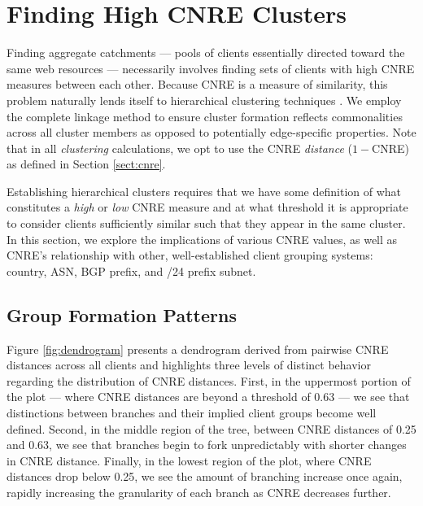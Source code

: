 \section{Finding High CNRE Clusters} \label{sect:finding}

\begin{figure*}
    \caption{Dendrogram of CNRE distance across all client pairs}
    \label{fig:dendrogram}
\end{figure*}

Finding aggregate catchments --- pools of clients essentially directed toward
the same web resources --- necessarily involves finding sets of clients with high
CNRE measures between each other. Because CNRE is a measure of similarity, this
problem naturally lends itself to hierarchical clustering techniques \cite{murtagh1983survey}. 
We employ the complete linkage method to ensure cluster formation reflects commonalities
across all cluster members as opposed to potentially edge-specific properties.
Note that in all \emph{clustering} calculations, we opt to use the CNRE \emph{distance}
(\(1-\)CNRE) as defined in Section \ref{sect:cnre}.

Establishing hierarchical clusters requires that we have some definition of what
constitutes a \emph{high} or \emph{low} CNRE measure and at what threshold it is
appropriate to consider clients sufficiently similar such that they appear in
the same cluster. In this section, we explore the implications of various CNRE
values, as well as CNRE's relationship with other, well-established client grouping
systems: country, ASN, BGP prefix, and /24 prefix subnet.

\begin{figure*}
    \caption{Dendrogram of CNRE distance across all client pairs}
    \label{fig:dendrogram}
\end{figure*}

\subsection{Group Formation Patterns}
\label{s:formation}

Figure \ref{fig:dendrogram} presents a dendrogram derived from pairwise CNRE
distances across all clients and highlights three levels of distinct behavior
regarding the distribution of CNRE distances. First, in the uppermost portion of
the plot --- where CNRE distances are beyond a threshold of 0.63 --- we see
that distinctions between branches and their implied client groups become well
defined. Second, in the middle region of the tree, between CNRE distances of
0.25 and 0.63, we see that branches begin to fork unpredictably with shorter
changes in CNRE distance. Finally, in the lowest region of the plot, where CNRE
distances drop below 0.25, we see the amount of branching increase once again,
rapidly increasing the granularity of each branch as CNRE decreases further. 


